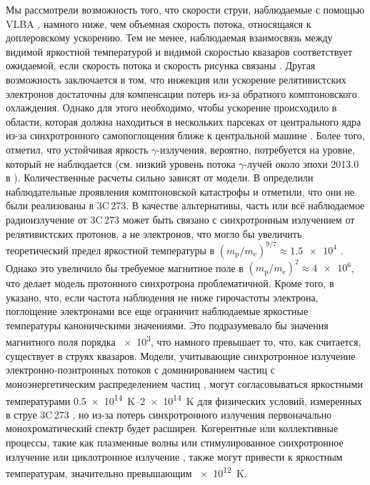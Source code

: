 Мы рассмотрели возможность того, что скорости струи, наблюдаемые с помощью VLBA \cite{Lister_2013},
намного ниже, чем объемная скорость потока, относящаяся к доплеровскому ускорению. Тем не менее,
наблюдаемая взаимосвязь между видимой яркостной температурой и видимой скоростью квазаров
соответствует ожидаемой, если скорость потока и скорость рисунка связаны
\cite{Kovalev_2005,Homan_2006}. Другая возможность заключается в том, что инжекция или ускорение
релятивистских электронов достаточны для компенсации потерь из-за обратного комптоновского
охлаждения. Однако для этого необходимо, чтобы ускорение происходило в области, которая должна
находиться в нескольких парсеках от центрального ядра из-за синхротронного самопоглощения ближе к
центральной машине \cite{Blandford_Konigl_1979,Pushkarev_2012}. Более того, \cite{Readhead_1994}
отметил, что устойчивая яркость $\gamma$-излучения, вероятно, потребуется на уровне, который не
наблюдается (см. низкий уровень потока $\gamma$-лучей около эпохи 2013.0 в
\cite{Ramakrishnan_2015}). Количественные расчеты сильно зависят от модели. В
\cite{Petropoulou_2015} определили наблюдательные проявления комптоновской катастрофы и отметили,
что они не были реализованы в 3C\,273. В качестве альтернативы, часть или всё наблюдаемое
радиоизлучение от 3C\,273 может быть связано с синхротронным излучением от релятивистских протонов,
а не электронов, что могло бы увеличить теоретический предел яркостной температуры в
$(m_\text{p}/m_\text{e})^{9/7} \approx \num{1.5e4}$ \cite{Jukes_1967}. Однако это увеличило бы
требуемое магнитное поле в $(m_\text{p}/m_\text{e})^{2} \approx \num{4e6}$, что делает модель
протонного синхротрона проблематичной. Кроме того, в \cite{Rees_1968} указано, что, если частота
наблюдения не ниже гирочастоты электрона, поглощение электронами все еще ограничит наблюдаемые
яркостные температуры каноническими значениями. Это подразумевало бы значения магнитного поля
порядка \SI{e3}{\gauss}, что намного превышает то, что, как считается, существует в струях квазаров.
Модели, учитывающие синхротронное излучение электронно-позитронных потоков с доминированием частиц с
моноэнергетическим распределением частиц \cite{Tsang_2007}, могут согласовываться яркостными
температурами \SIrange[fixed-exponent=14,scientific-notation=fixed]{0.5e14}{2e14}{\kelvin} для
физических условий, измеренных в струе 3C\,273 \cite{Savolainen_2010}, но из-за потерь
синхротронного излучения первоначально монохроматический спектр будет расширен. Когерентные или
коллективные процессы, такие как плазменные волны или стимулированное синхротронное излучение
\cite{Melrose_1999} или циклотронное излучение \cite{Begelman_2005}, также могут привести к
яркостным температурам, значительно превышающим \SI{e12}{\kelvin}.


